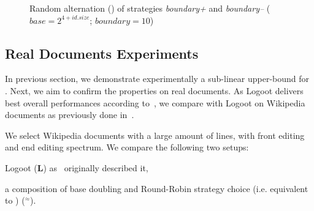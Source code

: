 \begin{figure}
\small
\begin{center}

\caption{Random alternation (\textbf{\NAME{}}) of strategies \emph{boundary+}
  and \emph{boundary--} ($base=2^{4+id.size}$; $boundary=10$)}
\label{fig:lseqexperiment}
\end{center}
\end{figure}

\subsection{Real Documents Experiments}

In previous section, we demonstrate experimentally a sub-linear upper-bound for
\NAME{}. Next, we aim to confirm the \NAME{} properties on real documents. As
Logoot delivers best overall performances according
to~\cite{ahmed2011evaluating}, we compare \NAME{} with Logoot on Wikipedia
documents as previously done in~\cite{DBLP:journals/tpds/WeissUM10}.

We select Wikipedia documents with a large amount of lines, with front editing
and end editing spectrum. We compare the following two setups:
\begin{inparaenum}[(1)]
  \item Logoot (\textbf{L}) as~\cite{weiss2009logoot} originally described it,
  \item a composition of base doubling and Round-Robin strategy choice
    (i.e. equivalent to \NAME{}) (\textbf{\NAME{}}$^\approx$).
\end{inparaenum}

